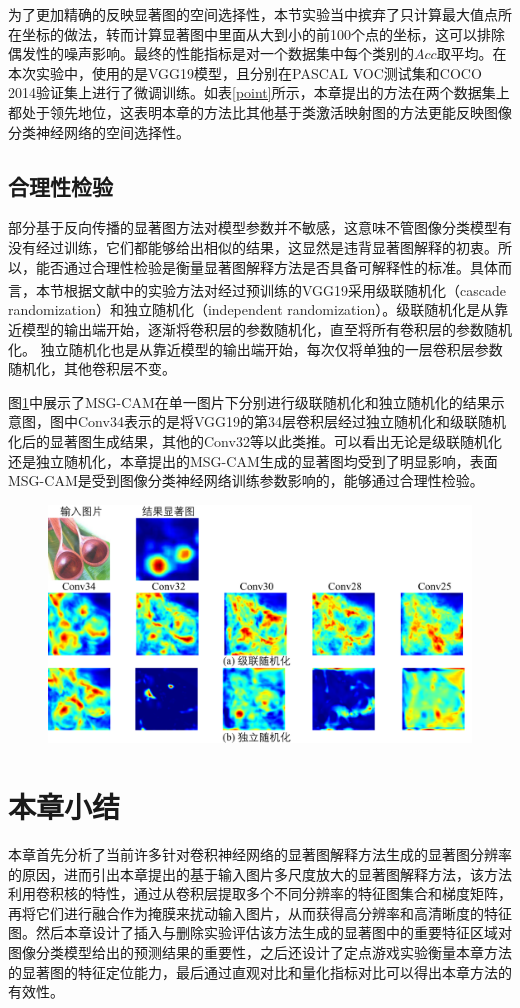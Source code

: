 为了更加精确的反映显著图的空间选择性，本节实验当中摈弃了只计算最大值点所在坐标的做法，转而计算显著图中里面从大到小的前100个点的坐标，这可以排除偶发性的噪声影响。最终的性能指标是对一个数据集中每个类别的$Acc$取平均。在本次实验中，使用的是VGG19模型，且分别在PASCAL VOC测试集和COCO 2014验证集上进行了微调训练。如表\ref{point}所示，本章提出的方法在两个数据集上都处于领先地位，这表明本章的方法比其他基于类激活映射图的方法更能反映图像分类神经网络的空间选择性。

\subsection{合理性检验}
部分基于反向传播的显著图方法对模型参数并不敏感，这意味不管图像分类模型有没有经过训练，它们都能够给出相似的结果，这显然是违背显著图解释的初衷。所以，能否通过合理性检验是衡量显著图解释方法是否具备可解释性的标准。具体而言，本节根据文献\textsuperscript{\cite{adebayo2018sanity}}中的实验方法对经过预训练的VGG19采用级联随机化（cascade randomization）和独立随机化（independent randomization）。级联随机化是从靠近模型的输出端开始，逐渐将卷积层的参数随机化，直至将所有卷积层的参数随机化。 独立随机化也是从靠近模型的输出端开始，每次仅将单独的一层卷积层参数随机化，其他卷积层不变。

图\ref{fig:sanitycheck}中展示了MSG-CAM在单一图片下分别进行级联随机化和独立随机化的结果示意图，图中Conv34表示的是将VGG19的第34层卷积层经过独立随机化和级联随机化后的显著图生成结果，其他的Conv32等以此类推。可以看出无论是级联随机化还是独立随机化，本章提出的MSG-CAM生成的显著图均受到了明显影响，表面MSG-CAM是受到图像分类神经网络训练参数影响的，能够通过合理性检验。

\begin{figure}[h]
	\centering 
	\includegraphics[width=15cm]{fig/ch3/sanityCheck.pdf}
	\label{fig:sanitycheck}
\end{figure}


\section{本章小结}\label{3:finish}
本章首先分析了当前许多针对卷积神经网络的显著图解释方法生成的显著图分辨率的原因，进而引出本章提出的基于输入图片多尺度放大的显著图解释方法，该方法利用卷积核的特性，通过从卷积层提取多个不同分辨率的特征图集合和梯度矩阵，再将它们进行融合作为掩膜来扰动输入图片，从而获得高分辨率和高清晰度的特征图。然后本章设计了插入与删除实验评估该方法生成的显著图中的重要特征区域对图像分类模型给出的预测结果的重要性，之后还设计了定点游戏实验衡量本章方法的显著图的特征定位能力，最后通过直观对比和量化指标对比可以得出本章方法的有效性。